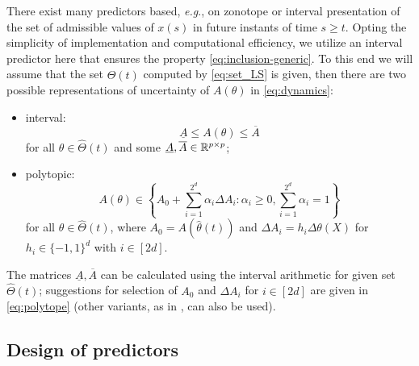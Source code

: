 \documentclass[letterpaper, 10 pt, conference]{ieeeconf}  %
\begin{document}
There exist many predictors based, \emph{e.g}., on zonotope \cite{le2012}
or interval \cite{Dinh2014,leurent2019interval} presentation of the
set of admissible values of $x(s)$ in future instants of time $s\geq t$.
Opting the simplicity of implementation and computational efficiency,
we utilize an interval predictor here that ensures the property \eqref{eq:inclusion-generic}.
To this end we will assume that the set $\hat{\Theta}(t)$ computed
by \eqref{eq:set_LS} is given, then there are two possible representations
of uncertainty of $A(\theta)$ in \eqref{eq:dynamics}:
\begin{itemize}
\item interval:
\begin{equation}
\underline{A}\leq A(\theta)\leq\overline{A}\label{eq:interval}
\end{equation}
for all $\theta\in\hat{\Theta}(t)$ and some $\underline{A},\overline{A}\in\mathbb{R}^{p\times p}$;
\item polytopic:
\begin{equation}
A(\theta)\in\left\{ A_{0}+\sum_{i=1}^{2^{d}}\alpha_{i}\Delta A_{i}:\alpha_{i}\geq0,\sum_{i=1}^{2^{d}}\alpha_{i}=1\right\} \label{eq:polytope}
\end{equation}
for all $\theta\in\hat{\Theta}(t)$, where $A_{0}=A(\hat{\theta}(t))$
and $\Delta A_{i}=h_{i}\Delta\theta(X)$ for $h_{i}\in\{-1,1\}^{d}$
with $i\in[2d]$.
\end{itemize}
The matrices $\underline{A},\overline{A}$ can be calculated using
the interval arithmetic for given set $\hat{\Theta}(t)$; suggestions
for selection of $A_{0}$ and $\Delta A_{i}$ for $i\in[2d]$ are
given in \eqref{eq:polytope} (other variants, as in \cite{delos2015},
can also be used).

\subsection{Design of predictors}
\end{document}
